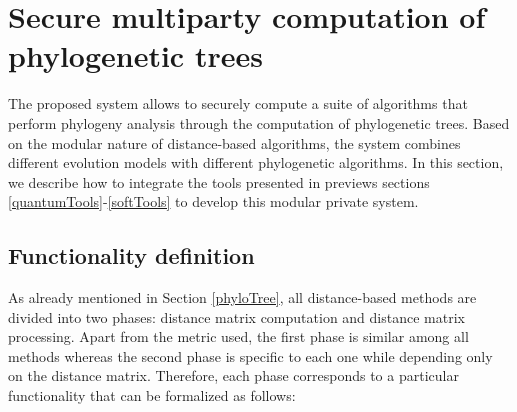\section{Secure multiparty computation of phylogenetic trees} \label{smcPhylo}

The proposed system allows to securely compute a suite of algorithms that perform phylogeny analysis through the computation of phylogenetic trees. Based on the modular nature of distance-based algorithms, the system combines different evolution models with different phylogenetic algorithms. In this section, we describe how to integrate the tools presented in previews sections \ref{quantumTools}-\ref{softTools} to develop this modular private system. 



\subsection{Functionality definition}\label{Functionality}

As already mentioned in Section \ref{phyloTree}, all distance-based methods are divided into two phases: distance matrix computation and distance matrix processing. Apart from the metric used, the first phase is similar among all methods whereas the second phase is specific to each one while depending only on the distance matrix. Therefore, each phase corresponds to a particular functionality that can be formalized as follows: 

